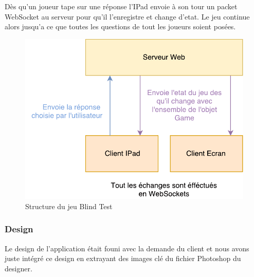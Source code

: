\documentclass{article}
\begin{document}
Dès qu'un joueur tape sur une réponse l'IPad envoie à son tour un packet WebSocket au serveur pour qu'il l'enregistre et change d'etat.
Le jeu continue alors jusqu'a ce que toutes les questions de tout les joueurs soient posées.

\begin{figure}[h]
    \centering
    \includegraphics{ah-blindtest.pdf}
    \caption{Structure du jeu Blind Test}
\end{figure}

\subsubsection{Design}

Le design de l'application était founi avec la demande du client et nous avons juste intégré ce design en extrayant des images clé du fichier Photoshop du designer.
\end{document}
